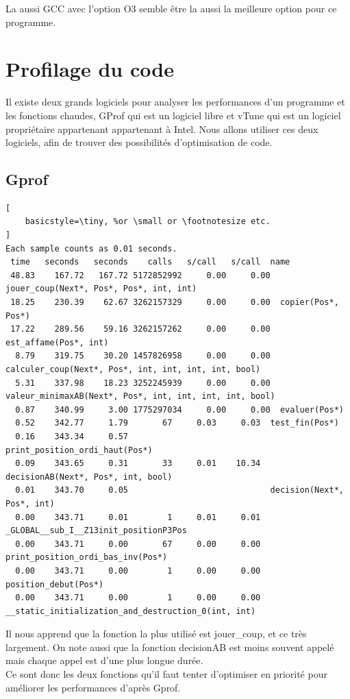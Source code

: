 \documentclass[
 aip,
 jmp,
 amsmath,amssymb,
 reprint
]{revtex4-1}
\begin{document}
La aussi GCC avec l'option O3 semble être la aussi la meilleure option pour ce programme.

\section{Profilage du code}

Il existe deux grands logiciels pour analyser les performances d'un programme et les fonctions chaudes, GProf qui est un logiciel libre et vTune qui est un logiciel propriétaire appartenant appartenant à Intel. Nous allons utiliser ces deux logiciels, afin de trouver des possibilités d'optimisation de code.

\subsection{Gprof}

\begin{lstlisting}[
    basicstyle=\tiny, %or \small or \footnotesize etc.
]
Each sample counts as 0.01 seconds.                 
 time   seconds   seconds    calls   s/call   s/call  name    
 48.83    167.72   167.72 5172852992     0.00     0.00  jouer_coup(Next*, Pos*, Pos*, int, int)
 18.25    230.39    62.67 3262157329     0.00     0.00  copier(Pos*, Pos*)
 17.22    289.56    59.16 3262157262     0.00     0.00  est_affame(Pos*, int)
  8.79    319.75    30.20 1457826958     0.00     0.00  calculer_coup(Next*, Pos*, int, int, int, int, bool)
  5.31    337.98    18.23 3252245939     0.00     0.00  valeur_minimaxAB(Next*, Pos*, int, int, int, int, bool)
  0.87    340.99     3.00 1775297034     0.00     0.00  evaluer(Pos*)
  0.52    342.77     1.79       67     0.03     0.03  test_fin(Pos*)
  0.16    343.34     0.57                             print_position_ordi_haut(Pos*)
  0.09    343.65     0.31       33     0.01    10.34  decisionAB(Next*, Pos*, int, bool)
  0.01    343.70     0.05                             decision(Next*, Pos*, int)
  0.00    343.71     0.01        1     0.01     0.01  _GLOBAL__sub_I__Z13init_positionP3Pos
  0.00    343.71     0.00       67     0.00     0.00  print_position_ordi_bas_inv(Pos*)
  0.00    343.71     0.00        1     0.00     0.00  position_debut(Pos*)
  0.00    343.71     0.00        1     0.00     0.00  __static_initialization_and_destruction_0(int, int)
\end{lstlisting}

Il nous apprend que la fonction la plus utilisé est jouer\_coup, et ce très largement. On note aussi que la fonction decisionAB est moins souvent appelé mais chaque appel est d'une plus longue durée.\\
Ce sont donc les deux fonctions qu'il faut tenter d'optimiser en priorité pour améliorer les performances d'après Gprof.\\
\end{document}

